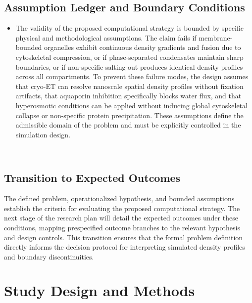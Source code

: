 \documentclass[conference]{IEEEtran}
\begin{document}
\subsection{Assumption Ledger and Boundary Conditions}
\begin{itemize}
\item The validity of the proposed computational strategy is bounded by specific physical and methodological assumptions. The claim fails if membrane-bounded organelles exhibit continuous density gradients and fusion due to cytoskeletal compression, or if phase-separated condensates maintain sharp boundaries, or if non-specific salting-out produces identical density profiles across all compartments. To prevent these failure modes, the design assumes that cryo-ET can resolve nanoscale spatial density profiles without fixation artifacts, that aquaporin inhibition specifically blocks water flux, and that hyperosmotic conditions can be applied without inducing global cytoskeletal collapse or non-specific protein precipitation. These assumptions define the admissible domain of the problem and must be explicitly controlled in the simulation design.
\end{itemize}~\cite{cite_9ae4c49700eea560,cite_c2d09a021a2238e3,cite_e2b5e3dbdb69d6a2}

\subsection{Transition to Expected Outcomes}
The defined problem, operationalized hypothesis, and bounded assumptions establish the criteria for evaluating the proposed computational strategy. The next stage of the research plan will detail the expected outcomes under these conditions, mapping prespecified outcome branches to the relevant hypothesis and design controls. This transition ensures that the formal problem definition directly informs the decision protocol for interpreting simulated density profiles and boundary discontinuities.

\section{Study Design and Methods}
\end{document}
